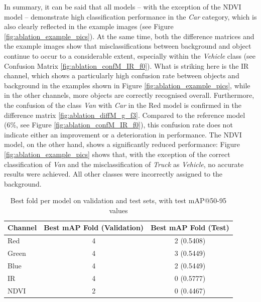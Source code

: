 In summary, it can be said that all models – with the exception of the NDVI model – demonstrate high classification performance in the \textit{Car} category, which is also clearly reflected in the example images (see Figure \ref{fig:ablation_example_pics}). At the same time, both the difference matrices and the example images show that misclassifications between background and object continue to occur to a considerable extent, especially within the \textit{Vehicle} class (see Confusion Matrix \ref{fig:ablation_confM_IR_f0}). What is striking here is the IR channel, which shows a particularly high confusion rate between objects and background in the examples shown in Figure \ref{fig:ablation_example_pics}, while in the other channels, more objects are correctly recognised overall. Furthermore, the confusion of the class \textit{Van} with \textit{Car} in the Red model is confirmed in the difference matrix \ref{fig:ablation_diffM_g_f3}. Compared to the reference model (6\%, see Figure \ref{fig:ablation_confM_IR_f0}), this confusion rate does not indicate either an improvement or a deterioration in performance. The NDVI model, on the other hand, shows a significantly reduced performance: Figure \ref{fig:ablation_example_pics} shows that, with the exception of the correct classification of \textit{Van} and the misclassification of \textit{Truck} as \textit{Vehicle}, no accurate results were achieved. All other classes were incorrectly assigned to the background.






\begin{table}[h]
\centering
\begin{tabular}{l c c}
\hline
\textbf{Channel} & \textbf{Best mAP Fold (Validation)} & \textbf{Best mAP Fold (Test)} \\ 
\hline
Red   & 4 & 2 (0.5408) \\
Green & 4 & 3 (0.5449) \\
Blue  & 4 & 2 (0.5449) \\
IR    & 4 & 0 (0.5777) \\
NDVI  & 2 & 0 (0.4467) \\
\hline
\end{tabular}
\caption{Best fold per model on validation and test sets, with test mAP@50-95 values}
\label{tab:ablation_best_folds_test}
\end{table}





